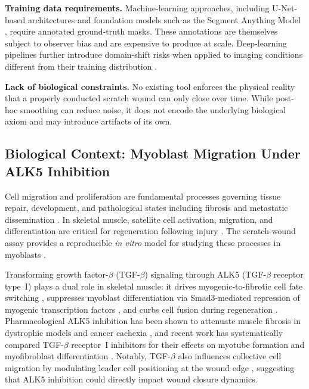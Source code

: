 \textbf{Training data requirements.} Machine-learning approaches, including U-Net-based architectures \citep{Ronneberger2015,Dogru2024,Naser2025} and foundation models such as the Segment Anything Model \citep{Lehmann2024}, require annotated ground-truth masks. These annotations are themselves subject to observer bias and are expensive to produce at scale. Deep-learning pipelines further introduce domain-shift risks when applied to imaging conditions different from their training distribution \citep{Oldenburg2021}.

\textbf{Lack of biological constraints.} No existing tool enforces the physical reality that a properly conducted scratch wound can only close over time. While post-hoc smoothing can reduce noise, it does not encode the underlying biological axiom and may introduce artifacts of its own.

\subsection{Biological Context: Myoblast Migration Under ALK5 Inhibition}

Cell migration and proliferation are fundamental processes governing tissue repair, development, and pathological states including fibrosis and metastatic dissemination \citep{Haeger2013,Ele2020}. In skeletal muscle, satellite cell activation, migration, and differentiation are critical for regeneration following injury \citep{Goetsch2013,Webster2013,Kowalski2017}. The scratch-wound assay provides a reproducible \textit{in vitro} model for studying these processes in myoblasts \citep{Goetsch2011}.

Transforming growth factor-$\beta$ (TGF-$\beta$) signaling through ALK5 (TGF-$\beta$ receptor type~I) plays a dual role in skeletal muscle: it drives myogenic-to-fibrotic cell fate switching \citep{Li2004,Loiselle2009}, suppresses myoblast differentiation via Smad3-mediated repression of myogenic transcription factors \citep{McFarland2001}, and curbs cell fusion during regeneration \citep{Girardi2021}. Pharmacological ALK5 inhibition has been shown to attenuate muscle fibrosis in dystrophic models \citep{Ceco2013,Cohn2007} and cancer cachexia \citep{LachTrifilieff2019}, and recent work has systematically compared TGF-$\beta$ receptor~I inhibitors for their effects on myotube formation \citep{WeissA2025} and myofibroblast differentiation \citep{WeissB2025}. Notably, TGF-$\beta$ also influences collective cell migration by modulating leader cell positioning at the wound edge \citep{Vishwakarma2014}, suggesting that ALK5 inhibition could directly impact wound closure dynamics.


